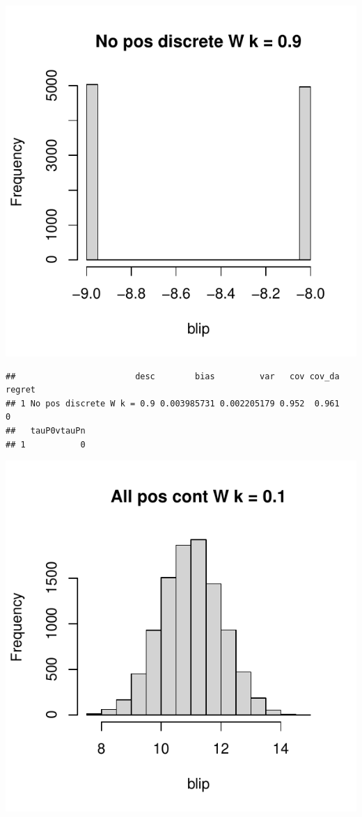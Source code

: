 \documentclass[11pt]{article}\usepackage[]{graphicx}\usepackage[table]{xcolor}
\makeatletter
\def\maxwidth{ %
  \ifdim\Gin@nat@width>\linewidth
    \linewidth
  \else
    \Gin@nat@width
  \fi
}
\newenvironment{kframe}{%
 \def\at@end@of@kframe{}%
 \ifinner\ifhmode%
  \def\at@end@of@kframe{\end{minipage}}%
  \begin{minipage}{\columnwidth}%
 \fi\fi%
 \def\FrameCommand##1{\hskip\@totalleftmargin \hskip-\fboxsep
 \colorbox{shadecolor}{##1}\hskip-\fboxsep
     \hskip-\linewidth \hskip-\@totalleftmargin \hskip\columnwidth}%
 \MakeFramed {\advance\hsize-\width
   \@totalleftmargin\z@ \linewidth\hsize
   \@setminipage}}%
 {\par\unskip\endMakeFramed%
 \at@end@of@kframe}
\newenvironment{knitrout}{}{} %
\makeatother
\begin{document}
\begin{knitrout}
\includegraphics[width=\maxwidth]{figure/unnamed-chunk-4-6} 
\begin{kframe}\begin{verbatim}
##                        desc        bias         var   cov cov_da regret
## 1 No pos discrete W k = 0.9 0.003985731 0.002205179 0.952  0.961      0
##   tauP0vtauPn
## 1           0
\end{verbatim}
\end{kframe}
\includegraphics[width=\maxwidth]{figure/unnamed-chunk-4-7} 

\end{knitrout}
\end{document}
